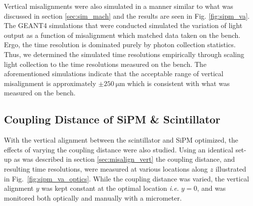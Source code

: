 Vertical misalignments were also simulated in a manner similar to what was discussed in section \ref{sec:sim_mach} and the results are seen in Fig. \ref{fig:sipm_va}.
The GEANT4 simulations that were conducted simulated the variation of light output as a function of misalignment which matched data taken on the bench.  Ergo, the time resolution is dominated purely by photon collection statistics.  Thus, we determined the simulated time resolutions empirically through scaling light collection to the time resolutions measured on the bench.  The aforementioned simulations indicate that the acceptable range of vertical misalignment is approximately $\pm 250\ \mathrm{\mu m}$ \cite{puneet_sim_talk} which is consistent with what was measured on the bench.  

\subsection{Coupling Distance of SiPM \& Scintillator}

With the vertical alignment between the scintillator and SiPM optimized, the effects of varying the coupling distance were also studied.  Using an identical set-up as was described in section \ref{sec:misalign_vert} the coupling distance, and resulting time resolutions, were measured at various locations along $z$ illustrated in Fig.~\ref{fig:sipm_va_optics}.  While the coupling distance was varied, the vertical alignment $y$ was kept constant at the optimal location \textit{i.e.} $y = 0$, and was monitored both optically and manually with a micrometer.

